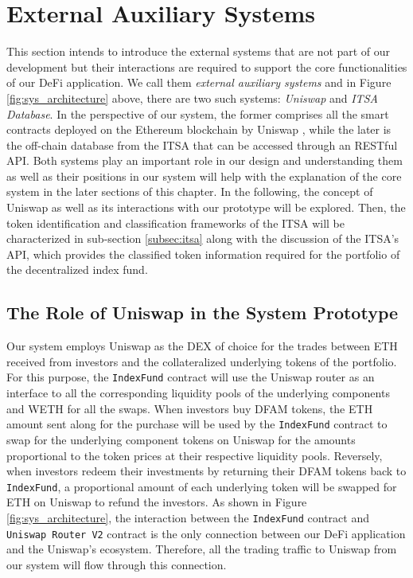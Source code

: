 \section{External Auxiliary Systems} \label{sec:auxsystems}

This section intends to introduce the external systems that are not part of our development but their interactions are required to support the core functionalities of our DeFi application. We call them \textit{external auxiliary systems} and in Figure \ref{fig:sys_architecture} above, there are two such systems: \textit{Uniswap} and \textit{ITSA Database}. In the perspective of our system, the former comprises all the smart contracts deployed on the Ethereum blockchain by Uniswap , while the later is the off-chain database from the ITSA that can be accessed through an RESTful API. Both systems play an important role in our design and understanding them as well as their positions in our system will help with the explanation of the core system in the later sections of this chapter. In the following, the concept of Uniswap as well as its interactions with our prototype will be explored. Then, the token identification and classification frameworks of the ITSA will be characterized in sub-section \ref{subsec:itsa} along with the discussion of the ITSA's API, which provides the classified token information required for the portfolio of the decentralized index fund. 

\subsection{The Role of Uniswap in the System Prototype} 

Our system employs Uniswap as the DEX of choice for the trades between ETH received from investors and the collateralized underlying tokens of the portfolio. For this purpose, the \texttt{IndexFund} contract will use the Uniswap router as an interface to all the corresponding liquidity pools of the underlying components and WETH for all the swaps. When investors buy DFAM tokens, the ETH amount sent along for the purchase will be used by the \texttt{IndexFund} contract to swap for the underlying component tokens on Uniswap for the amounts proportional to the token prices at their respective liquidity pools. Reversely, when investors redeem their investments by returning their DFAM tokens back to \texttt{IndexFund}, a proportional amount of each underlying token will be swapped for ETH on Uniswap to refund the investors. As shown in Figure \ref{fig:sys_architecture}, the interaction between the \texttt{IndexFund} contract and \texttt{Uniswap Router V2} contract is the only connection between our DeFi application and the Uniswap's ecosystem. Therefore, all the trading traffic to Uniswap from our system will flow through this connection.


